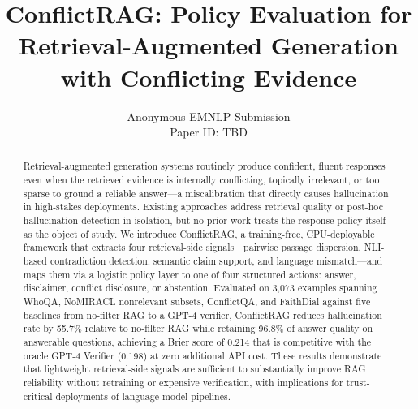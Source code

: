 \documentclass[11pt]{article}
\title{ConflictRAG: Policy Evaluation for Retrieval-Augmented Generation with Conflicting Evidence}
\author{Anonymous EMNLP Submission \\ Paper ID: TBD}
\newcommand{\method}{ConflictRAG}
\begin{document}
\maketitle

\begin{abstract}
Retrieval-augmented generation systems routinely produce confident, fluent responses even when the retrieved evidence is internally conflicting, topically irrelevant, or too sparse to ground a reliable answer---a miscalibration that directly causes hallucination in high-stakes deployments. Existing approaches address retrieval quality or post-hoc hallucination detection in isolation, but no prior work treats the response policy itself as the object of study. We introduce \method{}, a training-free, CPU-deployable framework that extracts four retrieval-side signals---pairwise passage dispersion, NLI-based contradiction detection, semantic claim support, and language mismatch---and maps them via a logistic policy layer to one of four structured actions: answer, disclaimer, conflict disclosure, or abstention. Evaluated on 3,073 examples spanning WhoQA, NoMIRACL nonrelevant subsets, ConflictQA, and FaithDial against five baselines from no-filter RAG to a GPT-4 verifier, \method{} reduces hallucination rate by 55.7\% relative to no-filter RAG while retaining 96.8\% of answer quality on answerable questions, achieving a Brier score of 0.214 that is competitive with the oracle GPT-4 Verifier (0.198) at zero additional API cost. These results demonstrate that lightweight retrieval-side signals are sufficient to substantially improve RAG reliability without retraining or expensive verification, with implications for trust-critical deployments of language model pipelines.
\end{abstract}













\appendix





\end{document}
